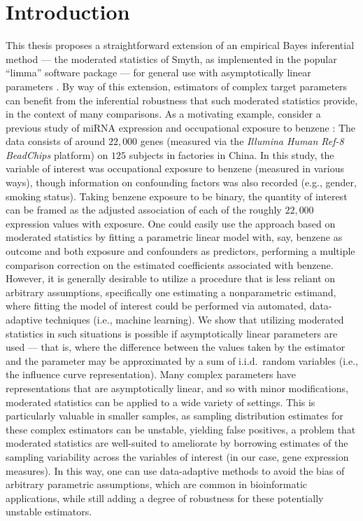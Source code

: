 \chapter{Introduction}

This thesis proposes a straightforward extension of an empirical Bayes
inferential method --- the moderated statistics of Smyth, as implemented in the
popular ``limma'' software package \cite{smyth2004linear} --- for general use
with asymptotically linear parameters \cite{tsiatis2007semiparametric,
van2011targeted}. By way of this extension, estimators of complex target
parameters can benefit from the inferential robustness that such moderated
statistics provide, in the context of many comparisons. As a motivating example,
consider a previous study of miRNA expression and occupational exposure to
benzene \cite{mchale2011global}: The data consists of around $22,000$ genes
(measured via the \textit{Illumina Human Ref-8 BeadChips} platform) on $125$
subjects in factories in China. In this study, the variable of interest was
occupational exposure to benzene (measured in various ways), though information
on confounding factors was also recorded (e.g., gender, smoking status). Taking
benzene exposure to be binary, the quantity of interest can be framed as the
adjusted association of each of the roughly $22,000$ expression values with
exposure. One could easily use the approach based on moderated statistics by
fitting a parametric linear model with, say, benzene as outcome and both
exposure and confounders as predictors, performing a multiple comparison
correction on the estimated coefficients associated with benzene. However, it is
generally desirable to utilize a procedure that is less reliant on arbitrary
assumptions, specifically one estimating a nonparametric estimand, where fitting
the model of interest could be performed via automated, data-adaptive techniques
(i.e., machine learning). We show that utilizing moderated statistics in such
situations is possible if asymptotically linear parameters are used --- that is,
where the difference between the values taken by the estimator and the parameter
may be approximated by a sum of i.i.d.~random variables (i.e., the influence
curve representation). Many complex parameters have representations that are
asymptotically linear, and so with minor modifications, moderated statistics can
be applied to a wide variety of settings. This is particularly valuable in
smaller samples, as sampling distribution estimates for these complex estimators
can be unstable, yielding false positives, a problem that moderated statistics
are well-suited to ameliorate by borrowing estimates of the sampling variability
across the variables of interest (in our case, gene expression measures). In
this way, one can use data-adaptive methods to avoid the bias of arbitrary
parametric assumptions, which are common in bioinformatic applications, while
still adding a degree of robustness for these potentially unstable estimators.

